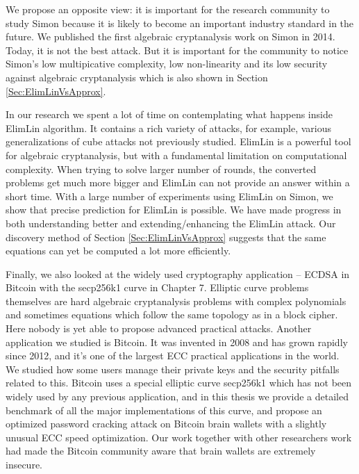 We propose an opposite view: it is important for the research community to study Simon because it is likely to become an important industry standard in the future. We published the first algebraic cryptanalysis work on Simon in 2014. Today, it is not the best attack. But it is important for the community to notice Simon's low multipicative complexity, low non-linearity and its low security against algebraic cryptanalysis which is also shown 
in Section \ref{Sec:ElimLinVsApprox}. 

In our research we spent a lot of time on contemplating what happens inside ElimLin algorithm. It contains a rich variety of attacks, for example, various generalizations of cube attacks not previously studied. 
ElimLin is a powerful tool for algebraic cryptanalysis, but with a fundamental limitation on computational complexity. When trying to solve larger number of rounds, the converted problems get much more bigger and ElimLin can not provide an answer within a short time. With a large number of experiments using ElimLin on Simon, we show that precise prediction for ElimLin is possible. We have made progress in both understanding better and extending/enhancing the ElimLin attack. Our discovery method 
of Section \ref{Sec:ElimLinVsApprox} suggests that the same equations can yet be computed a lot more efficiently. 

Finally, we also looked at the widely used cryptography application --  ECDSA in Bitcoin with the secp256k1 curve in Chapter 7. Elliptic curve problems themselves are hard algebraic cryptanalysis problems with complex polynomials and sometimes equations which follow the same topology as in a block cipher. Here nobody is yet able to 
propose advanced practical attacks. Another application we studied is Bitcoin. 
It was invented in 2008 and has grown rapidly since 2012, and it's one of the largest ECC practical applications in the world. We studied how some users manage their private keys and the security pitfalls related to this. Bitcoin uses a special elliptic curve secp256k1 which has not been widely used by any previous application, and in this thesis we provide a detailed benchmark of all the major implementations of this curve, and propose an optimized password cracking attack on Bitcoin brain wallets with a slightly unusual ECC  speed optimization. Our work together with other researchers work had made the Bitcoin community aware that brain wallets are extremely insecure.  

